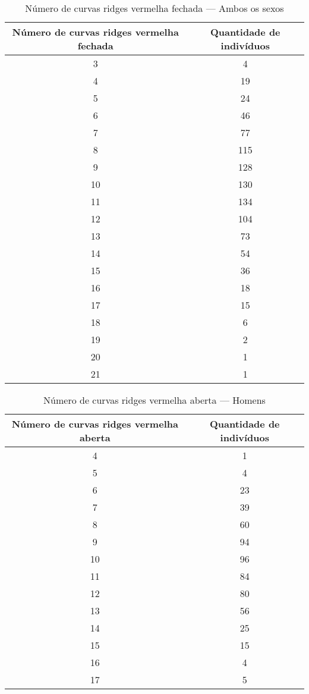 \documentclass[a4paper,12pt]{article}
\begin{document}
\begin{table}[h!]
\centering
\caption{Número de curvas ridges vermelha fechada — Ambos os sexos}
\begin{tabular}{c c}
\hline
\textbf{Número de curvas ridges vermelha fechada} & \textbf{Quantidade de indivíduos} \\ 
\hline
3  & 4    \\
4  & 19   \\
5  & 24   \\
6  & 46   \\
7  & 77   \\
8  & 115  \\
9  & 128  \\
10 & 130  \\
11 & 134  \\
12 & 104  \\
13 & 73   \\
14 & 54   \\
15 & 36   \\
16 & 18   \\
17 & 15   \\
18 & 6    \\
19 & 2    \\
20 & 1    \\
21 & 1    \\
\hline
\end{tabular}
\end{table}


\begin{table}[h!]
\centering
\caption{Número de curvas ridges vermelha aberta — Homens}
\begin{tabular}{c c}
\hline
\textbf{Número de curvas ridges vermelha aberta} & \textbf{Quantidade de indivíduos} \\ 
\hline
4  & 1   \\
5  & 4   \\
6  & 23  \\
7  & 39  \\
8  & 60  \\
9  & 94  \\
10 & 96  \\
11 & 84  \\
12 & 80  \\
13 & 56  \\
14 & 25  \\
15 & 15  \\
16 & 4   \\
17 & 5   \\
\hline
\end{tabular}
\end{table}
\end{document}
